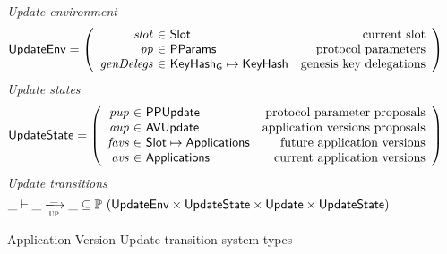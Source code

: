 \begin{figure}[htb]
  \emph{Update environment}
  \begin{equation*}
    \UpdateEnv =
    \left(
      \begin{array}{r@{~\in~}lr}
        \var{slot} & \Slot & \text{current slot}\\
        \var{pp} & \PParams & \text{protocol parameters}\\
        \var{genDelegs} & \KeyHashGen\mapsto\KeyHash & \text{genesis key delegations} \\
      \end{array}
    \right)
  \end{equation*}
  \emph{Update states}
  \begin{equation*}
    \UpdateState =
    \left(
      \begin{array}{r@{~\in~}lr}
        \var{pup} & \PPUpdate & \text{protocol parameter proposals} \\
        \var{aup} & \AVUpdate & \text{application versions proposals} \\
        \var{favs} & \Slot\mapsto\Applications & \text{future application versions} \\
        \var{avs} & \Applications & \text{current application versions} \\
      \end{array}
    \right)
  \end{equation*}
  \emph{Update transitions}
  \begin{equation*}
    \_ \vdash
    \var{\_} \trans{up}{\_} \var{\_}
    \subseteq \powerset (\UpdateEnv \times \UpdateState \times \Update \times \UpdateState)
  \end{equation*}
  \caption{Application Version Update transition-system types}
  \label{fig:ts-types:update}
\end{figure}

